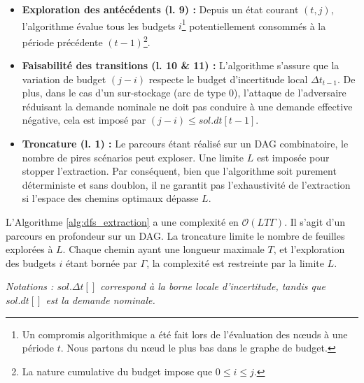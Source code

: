 \documentclass[11pt,a4paper]{article}
\begin{document}
\begin{itemize}
    \item \textbf{Exploration des antécédents (l. 9) :} Depuis un état courant $(t, j)$, l'algorithme évalue tous les budgets $i$\footnote{Un compromis algorithmique a été fait lors de l'évaluation des nœuds à une période $t$. Nous partons du nœud le plus bas dans le graphe de budget.} potentiellement consommés à la période précédente $(t-1)$\footnote{La nature cumulative du budget impose que $0 \leq i \leq j$.}.
    \item \textbf{Faisabilité des transitions (l. 10 \& 11) :} L'algorithme s'assure que la variation de budget $(j-i)$ respecte le budget d'incertitude local $\Delta t_{t-1}$. De plus, dans le cas d'un sur-stockage (arc de type 0), l'attaque de l'adversaire réduisant la demande nominale ne doit pas conduire à une demande effective négative, cela est imposé par $(j-i) \leq sol.dt[t-1]$.
    \item \textbf{Troncature (l. 1) :} Le parcours étant réalisé sur un DAG combinatoire, le nombre de pires scénarios peut exploser. Une limite $L$ est imposée pour stopper l'extraction. Par conséquent, bien que l'algorithme soit purement déterministe et sans doublon, il ne garantit pas l'exhaustivité de l'extraction si l'espace des chemins optimaux dépasse $L$.
\end{itemize}

L'Algorithme \ref{alg:dfs_extraction} a une complexité en $\mathcal{O}(LT\Gamma)$. Il s'agit d'un parcours en profondeur sur un DAG. La troncature limite le nombre de feuilles explorées à $L$. Chaque chemin ayant une longueur maximale $T$, et l'exploration des budgets $i$ étant bornée par $\Gamma$, la complexité est restreinte par la limite $L$.

\textit{Notations : $sol.\Delta t[]$ correspond à la borne locale d'incertitude, tandis que $sol.dt[]$ est la demande nominale.}
\end{document}
